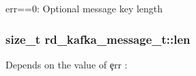 \begin{DoxyItemize}
\item {\ttfamily err==0}\-: Optional message key length 
\end{DoxyItemize}\hypertarget{structrd__kafka__message__t_a27c4e215c06110e44eec144d449400ae}{
\subsubsection[{len}]{\setlength{\rightskip}{0pt plus 5cm}size\-\_\-t rd\-\_\-kafka\-\_\-message\-\_\-t\-::len}}\label{structrd__kafka__message__t_a27c4e215c06110e44eec144d449400ae}
\begin{DoxyVerb}          Depends on the value of \c err :
\end{DoxyVerb}

